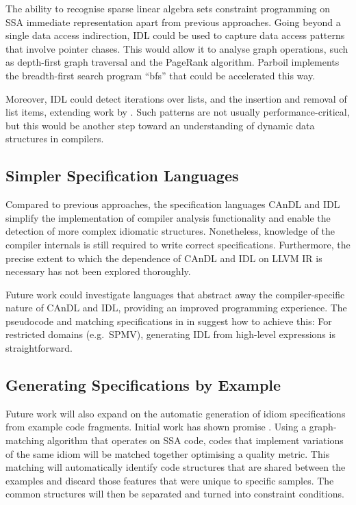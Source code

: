     The ability to recognise sparse linear algebra sets constraint programming
    on SSA immediate representation apart from previous approaches.
    Going beyond a single data access indirection, IDL could be used to capture
    data access patterns that involve pointer chases.
    This would allow it to analyse graph operations, such as depth-first graph
    traversal and the PageRank algorithm.
    Parboil implements the breadth-first search program ``bfs'' that could be
    accelerated this way.

    Moreover, IDL could detect iterations over lists, and the insertion and
    removal of list items, extending work by
    \citet{Manilov:2018:GPI:3178372.3179511}.
    Such patterns are not usually performance-critical, but this would be
    another step toward an understanding of dynamic data structures in compilers.

\subsection*{Simpler Specification Languages}

    Compared to previous approaches, the specification languages CAnDL and IDL
    simplify the implementation of compiler analysis functionality and enable
    the detection of more complex idiomatic structures.
    Nonetheless, knowledge of the compiler internals is still required to write
    correct specifications.
    Furthermore, the precise extent to which the dependence of CAnDL and IDL on
    LLVM IR is necessary has not been explored thoroughly.

    Future work could investigate languages that abstract away the
    compiler-specific nature of CAnDL and IDL, providing an improved programming
    experience.
    The pseudocode and matching specifications in
     in  suggest
    how to achieve this:
    For restricted domains (e.g.\ SPMV), generating IDL from high-level
    expressions is straightforward.

\subsection*{Generating Specifications by Example}

    Future work will also expand on the automatic generation of idiom
    specifications from example code fragments.
    Initial work has shown promise \citep{DBLP:conf/IEEEpact/CollieGO19}.
    Using a graph-matching algorithm that operates on SSA code, codes that
    implement variations of the same idiom will be matched together optimising
    a quality metric.
    This matching will automatically identify code structures that are shared
    between the examples and discard those features that were unique to
    specific samples.
    The common structures will then be separated and turned into constraint
    conditions.

